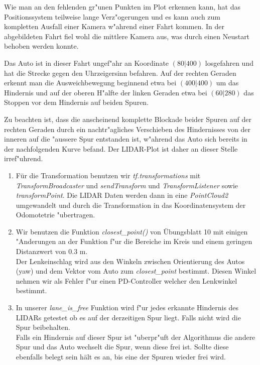 \documentclass[10pt,oneside,a4paper]{article}
\begin{document}
    Wie man an den fehlenden gr"unen Punkten im Plot erkennen kann, hat das Positionssystem
    teilweise lange Verz"ogerungen und es kann auch zum kompletten Ausfall einer Kamera w"ahrend
    einer Fahrt kommen. In der abgebildeten Fahrt fiel wohl die mittlere Kamera aus, was durch
    einen Neustart behoben werden konnte.

    Das Auto ist in dieser Fahrt ungef"ahr an Koordinate $(80 | 400)$ losgefahren und hat die
    Strecke gegen den Uhrzeigersinn befahren. Auf der rechten Geraden erkennt man die
    Ausweichbewegung beginnend etwa bei $(400 | 400)$ um das Hindernis und auf der oberen H"alfte
    der linken Geraden etwa bei $(60 | 280)$ das Stoppen vor dem Hindernis auf beiden Spuren.

    Zu beachten ist, dass die anscheinend komplette Blockade beider Spuren auf der rechten Geraden
    durch ein nachtr"agliches Verschieben des Hindernisses von der inneren auf die "aussere Spur
    entstanden ist, w"ahrend das Auto sich bereits in der nachfolgenden Kurve befand.
    Der LIDAR-Plot ist daher an dieser Stelle irref"uhrend.
	\begin{enumerate}
    \item Für die Transformation benutzen wir \emph{tf.transformations} mit
        \emph{TransformBroadcaster} und \emph{sendTransform} und \emph{TransformListener} sowie
        \emph{transformPoint}. Die LIDAR Daten werden dann in eine \emph{PointCloud2} umgewandelt
        und durch die Transformation in das Koordinatensystem der Odomotetrie "ubertragen.
    \item Wir benutzen die Funktion \emph{closest\_point()} von Übungsblatt 10 mit einigen
        "Anderungen an der Funktion f"ur die Bereiche im Kreis und einem geringen Distanzwert von
        0.3 m.\\
        Der Lenkeinschlag wird aus den Winkeln zwischen Orientierung des Autos (yaw) und dem
        Vektor vom Auto zum \emph{closest\_point} bestimmt. Diesen Winkel nehmen wir als Fehler
        f"ur einen PD-Controller welcher den Lenkwinkel bestimmt.
    \item In unserer \emph{lane\_is\_free} Funktion wird f"ur jedes erkannte Hindernis
        des LIDARs getestet ob es auf der derzeitigen Spur liegt. Falls nicht wird die Spur
        beibehalten. \\
        Falls ein Hindernis auf dieser Spur ist "uberpr"uft der Algorithmus die andere Spur und
        das Auto wechselt die Spur, wenn diese frei ist. Sollte diese ebenfalls belegt sein hält es
        an, bis eine der Spuren wieder frei wird.
	\end{enumerate}
\end{document}
